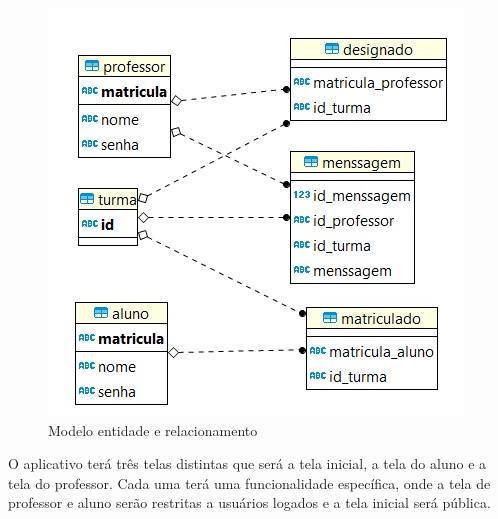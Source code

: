 \begin{figure}[H]
\centering
\includegraphics[scale=0.8]{figuras/entidaderelacionamentomobile}
\caption{Modelo entidade e relacionamento}
\label{fig:entidaderelacionamentomobile}
\end{figure}

O aplicativo terá três telas distintas que será a tela inicial, a tela do aluno e a tela do professor. Cada uma terá uma funcionalidade específica, onde a tela de professor e aluno serão restritas a usuários logados e a tela inicial será pública.

